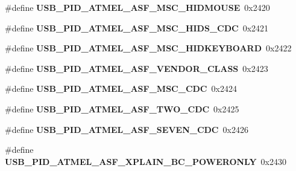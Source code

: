 \begin{DoxyCompactItemize}
\#define {\bfseries U\+S\+B\+\_\+\+P\+I\+D\+\_\+\+A\+T\+M\+E\+L\+\_\+\+A\+S\+F\+\_\+\+M\+S\+C\+\_\+\+H\+I\+D\+M\+O\+U\+SE}~0x2420
\item 
\mbox{\label{group__usb__atmel__ids__group_ga7f671a8fef4c800facd114d32ec13930}} 
\#define {\bfseries U\+S\+B\+\_\+\+P\+I\+D\+\_\+\+A\+T\+M\+E\+L\+\_\+\+A\+S\+F\+\_\+\+M\+S\+C\+\_\+\+H\+I\+D\+S\+\_\+\+C\+DC}~0x2421
\item 
\mbox{\label{group__usb__atmel__ids__group_ga323b1456acbbd9126e18618488321628}} 
\#define {\bfseries U\+S\+B\+\_\+\+P\+I\+D\+\_\+\+A\+T\+M\+E\+L\+\_\+\+A\+S\+F\+\_\+\+M\+S\+C\+\_\+\+H\+I\+D\+K\+E\+Y\+B\+O\+A\+RD}~0x2422
\item 
\mbox{\label{group__usb__atmel__ids__group_ga6f40a017a808ee64cc6628e729230594}} 
\#define {\bfseries U\+S\+B\+\_\+\+P\+I\+D\+\_\+\+A\+T\+M\+E\+L\+\_\+\+A\+S\+F\+\_\+\+V\+E\+N\+D\+O\+R\+\_\+\+C\+L\+A\+SS}~0x2423
\item 
\mbox{\label{group__usb__atmel__ids__group_gaaec5e91e3234b5e606ba733040bd2915}} 
\#define {\bfseries U\+S\+B\+\_\+\+P\+I\+D\+\_\+\+A\+T\+M\+E\+L\+\_\+\+A\+S\+F\+\_\+\+M\+S\+C\+\_\+\+C\+DC}~0x2424
\item 
\mbox{\label{group__usb__atmel__ids__group_ga3c9a3ea9e317f1f85577cdcc0006c694}} 
\#define {\bfseries U\+S\+B\+\_\+\+P\+I\+D\+\_\+\+A\+T\+M\+E\+L\+\_\+\+A\+S\+F\+\_\+\+T\+W\+O\+\_\+\+C\+DC}~0x2425
\item 
\mbox{\label{group__usb__atmel__ids__group_gacc4da5f577d8be8f22e417a18869106f}} 
\#define {\bfseries U\+S\+B\+\_\+\+P\+I\+D\+\_\+\+A\+T\+M\+E\+L\+\_\+\+A\+S\+F\+\_\+\+S\+E\+V\+E\+N\+\_\+\+C\+DC}~0x2426
\item 
\mbox{\label{group__usb__atmel__ids__group_ga5beb6949523c4d53a1974b7696a4d57f}} 
\#define {\bfseries U\+S\+B\+\_\+\+P\+I\+D\+\_\+\+A\+T\+M\+E\+L\+\_\+\+A\+S\+F\+\_\+\+X\+P\+L\+A\+I\+N\+\_\+\+B\+C\+\_\+\+P\+O\+W\+E\+R\+O\+N\+LY}~0x2430
\item 
\mbox{\label{group__usb__atmel__ids__group_gad0c62418cdc18878b60849412ab8bb23}} 

\end{DoxyCompactItemize}
